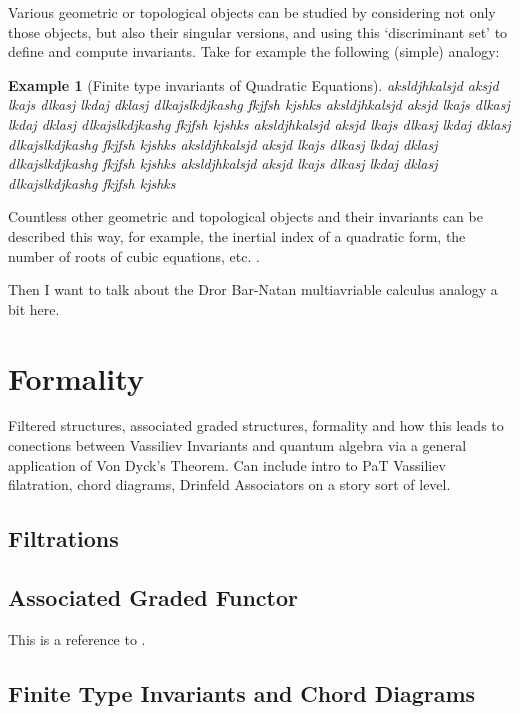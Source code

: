 \documentclass[12pt]{report}
\theoremstyle{regular}
\newtheorem{example}{Example}
\newcommand{\draftnote}[1]{
\begin{mdframed}[style=draftnote]
        {\color{Gray}{\scshape Note:} #1 }
\end{mdframed}
}
\begin{document}
        Various geometric or topological objects can be studied by considering not only those objects, but also their singular versions, and using this `discriminant set' to define and compute invariants. Take for example the following (simple) analogy:

        \begin{example}[Finite type invariants of Quadratic Equations]
                aksldjhkalsjd aksjd lkajs dlkasj lkdaj dklasj dlkajslkdjkashg fkjfsh kjshks
                aksldjhkalsjd aksjd lkajs dlkasj lkdaj dklasj dlkajslkdjkashg fkjfsh kjshks
                aksldjhkalsjd aksjd lkajs dlkasj lkdaj dklasj dlkajslkdjkashg fkjfsh kjshks
                aksldjhkalsjd aksjd lkajs dlkasj lkdaj dklasj dlkajslkdjkashg fkjfsh kjshks
                aksldjhkalsjd aksjd lkajs dlkasj lkdaj dklasj dlkajslkdjkashg fkjfsh kjshks
        \end{example}

        Countless other geometric and topological objects and their invariants can be described this way, for example, the inertial index of a quadratic form, the number of roots of cubic equations, etc. \cite{knots-links-and-their-invariants}.

        \draftnote{Then I want to talk about the Dror Bar-Natan multiavriable calculus analogy a bit here.}

        \chapter{Formality}
        Filtered structures, associated graded structures, formality and how this leads to conections between Vassiliev Invariants and quantum algebra via a general application of Von Dyck's Theorem. Can include intro to PaT Vassiliev filatration, chord diagrams, Drinfeld Associators on a story sort of level.

        \section{Filtrations}
        \section{Associated Graded Functor}

        This is a reference to \cite{the-knot-book}.

        \section{Finite Type Invariants and Chord Diagrams}
\end{document}
